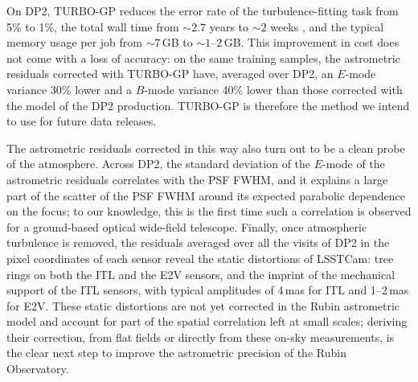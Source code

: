 On DP2, TURBO-GP reduces the error rate of the turbulence-fitting task from 5\% to 1\%, the total wall time from ${\sim}2.7$ years to ${\sim}2$ weeks
, and
the typical memory usage per job from ${\sim}7$\,GB to ${\sim}1$--$2$\,GB.
This improvement in cost does not come with a loss of accuracy: on the same training samples, the astrometric residuals corrected with TURBO-GP have,
averaged over DP2, an $E$-mode variance 30\% lower and a $B$-mode variance 40\% lower than those corrected with the  model
of the DP2 production.
TURBO-GP  is therefore the method we intend to use for future data releases.

The astrometric residuals corrected in this way also turn out to be a clean probe of the atmosphere.
Across DP2, the standard deviation of the $E$-mode of the astrometric residuals correlates with the PSF FWHM, and it explains a large part of the scatter of 
the PSF FWHM around its expected parabolic dependence on the focus; to our knowledge, this is the first time such a correlation is observed for a 
ground-based optical wide-field telescope.
Finally, once atmospheric turbulence is removed, the residuals averaged over all the visits of DP2 in the pixel coordinates of each sensor reveal 
the static distortions of LSSTCam: tree rings on both the ITL and the E2V sensors, and the imprint of the mechanical support of the ITL sensors, 
with typical amplitudes of 4\,mas for ITL and 1--2\,mas for E2V.
These static distortions are not yet corrected in the Rubin astrometric model and account for part of the spatial correlation left at small scales; 
deriving their correction, from flat fields or directly from these on-sky measurements, is the clear next step to improve the astrometric precision of the Rubin Observatory.
